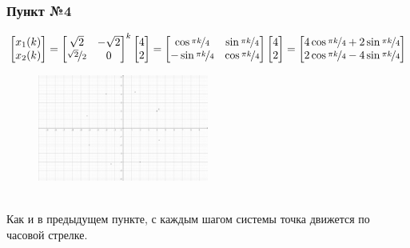 \documentclass[a3paper,14pt]{extarticle}
\begin{document}
\subsubsection*{Пункт №4}
$$\begin{bmatrix}
    x_1(k) \\ x_2(k)
\end{bmatrix} = \begin{bmatrix}
    \sqrt{2} & -\sqrt{2} \\ \nicefrac{\sqrt{2}}{2} & 0
\end{bmatrix}^k\begin{bmatrix}
    4 \\ 2
\end{bmatrix} = \begin{bmatrix}
    \cos{\nicefrac{\pi k}{4}} & \sin{\nicefrac{\pi k}{4}} \\
    -\sin{\nicefrac{\pi k}{4}} & \cos{\nicefrac{\pi k}{4}}
\end{bmatrix}\begin{bmatrix}
    4 \\ 2
\end{bmatrix} = \begin{bmatrix}
    4\cos{\nicefrac{\pi k}{4}}+2\sin{\nicefrac{\pi k}{4}} \\
    2\cos{\nicefrac{\pi k}{4}}-4\sin{\nicefrac{\pi k}{4}}
\end{bmatrix}$$
\begin{figure}[h]
    \centering\includegraphics[width=0.5\textwidth]{4.2.png}
\end{figure} \\
Как и в предыдущем пункте, с каждым шагом системы точка движется по часовой стрелке.\\[3em]
\end{document}
